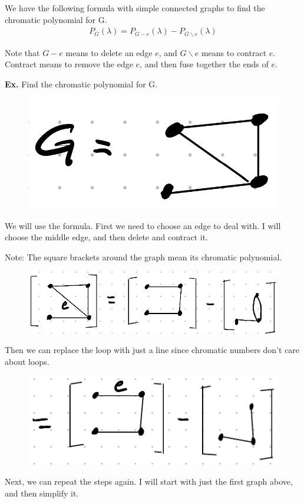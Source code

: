\documentclass[12pt,letterpaper]{article} \usepackage{amsmath} \usepackage{graphicx}  \usepackage{longtable}  \usepackage{amssymb}
\begin{document}
        We have the following formula with simple connected graphs to find the chromatic polynomial for G.
        \begin{align*}
            P_G (\lambda) = P_{G-e} (\lambda) - P_{G\backslash e} (\lambda)
        \end{align*}

        Note that $G-e$ means to delete an edge $e$, and $G\backslash e$ means to contract $e$. Contract means to remove the edge $e$, and then fuse together the ends of $e$.

        \begin{mdframed}
            \textbf{Ex. } Find the chromatic polynomial for G. 

            \begin{figure}[H]
                \centering
                \includegraphics[width=0.2\linewidth]{ex10.png}
            \end{figure}

            We will use the formula. First we need to choose an edge to deal with. I will choose the middle edge, and then delete and contract it. 

            Note: The square brackets around the graph mean its chromatic polynomial. 

            \begin{figure}[H]
                \centering
                \includegraphics[width=0.4\linewidth]{ex10 2.png}
            \end{figure}

            Then we can replace the loop with just a line since chromatic numbers don't care about loops. 

            \begin{figure}[H]
                \centering
                \includegraphics[width=0.3\linewidth]{ex10 3.png}
            \end{figure}

            Next, we can repeat the steps again. I will start with just the first graph above, and then simplify it. 


\end{mdframed}
\end{document}
